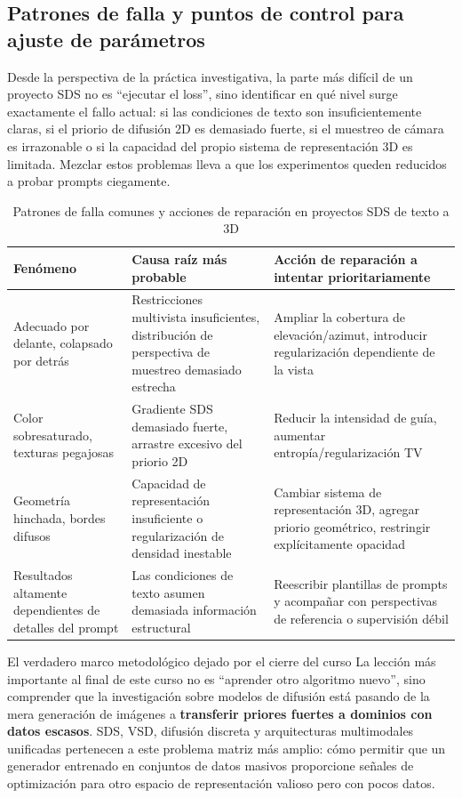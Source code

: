 \subsection{Patrones de falla y puntos de control para ajuste de parámetros}

Desde la perspectiva de la práctica investigativa, la parte más difícil de un proyecto SDS no es ``ejecutar el loss'', sino identificar en qué nivel surge exactamente el fallo actual: si las condiciones de texto son insuficientemente claras, si el priorio de difusión 2D es demasiado fuerte, si el muestreo de cámara es irrazonable o si la capacidad del propio sistema de representación 3D es limitada. Mezclar estos problemas lleva a que los experimentos queden reducidos a probar prompts ciegamente.

\begin{table}[H]
\centering
\begin{tabular}{p{} p{} p{}}
\toprule
Fenómeno & Causa raíz más probable & Acción de reparación a intentar prioritariamente \\
\midrule
Adecuado por delante, colapsado por detrás & Restricciones multivista insuficientes, distribución de perspectiva de muestreo demasiado estrecha & Ampliar la cobertura de elevación/azimut, introducir regularización dependiente de la vista \\
Color sobresaturado, texturas pegajosas & Gradiente SDS demasiado fuerte, arrastre excesivo del priorio 2D & Reducir la intensidad de guía, aumentar entropía/regularización TV \\
Geometría hinchada, bordes difusos & Capacidad de representación insuficiente o regularización de densidad inestable & Cambiar sistema de representación 3D, agregar priorio geométrico, restringir explícitamente opacidad \\
Resultados altamente dependientes de detalles del prompt & Las condiciones de texto asumen demasiada información estructural & Reescribir plantillas de prompts y acompañar con perspectivas de referencia o supervisión débil \\
\bottomrule
\end{tabular}
\caption{Patrones de falla comunes y acciones de reparación en proyectos SDS de texto a 3D}
\end{table}

\begin{importantbox}{El verdadero marco metodológico dejado por el cierre del curso}
La lección más importante al final de este curso no es ``aprender otro algoritmo nuevo'', sino comprender que la investigación sobre modelos de difusión está pasando de la mera generación de imágenes a \textbf{transferir priores fuertes a dominios con datos escasos}. SDS, VSD, difusión discreta y arquitecturas multimodales unificadas pertenecen a este problema matriz más amplio: cómo permitir que un generador entrenado en conjuntos de datos masivos proporcione señales de optimización para otro espacio de representación valioso pero con pocos datos.
\end{importantbox}

